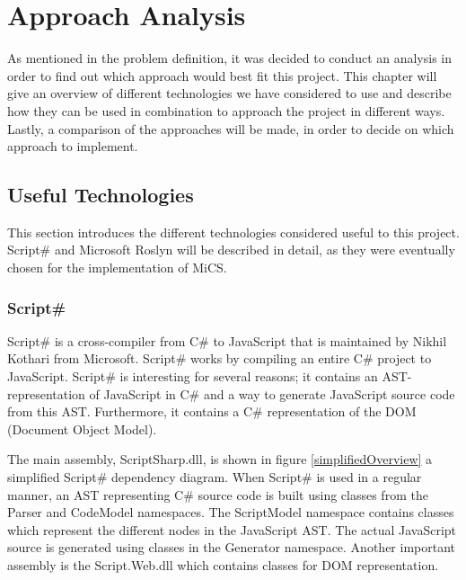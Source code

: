 \chapter{Approach Analysis}
	As mentioned in the problem definition, it was decided to conduct an analysis in order to find out which approach would best fit this project. This chapter will give an overview of different technologies we have considered to use and describe how they can be used in combination to approach the project in different ways. Lastly, a comparison of the approaches will be made, in order to decide on which approach to implement.

\section{Useful Technologies}
	This section introduces the different technologies considered useful to this project. Script\# and Microsoft Roslyn will be described in detail, as they were eventually chosen for the implementation of MiCS.

	

	\subsection{Script\#} %
	\label{sub:subsection_name}
		Script\# \cite{scriptsharp} is a cross-compiler from C\# to JavaScript that is maintained by Nikhil Kothari \cite{nikhilk} from Microsoft. Script\# works by compiling an entire C\# project to JavaScript. Script\# is interesting for several reasons; it contains an AST-representation of JavaScript in C\# and a way to generate JavaScript source code from this AST. Furthermore, it contains a C\# representation of the DOM (Document Object Model).

		The main assembly, ScriptSharp.dll, is shown in figure \ref{simplifiedOverview} a simplified Script\# dependency diagram. When Script\# is used in a regular manner, an AST representing C\# source code is built using classes from the Parser and CodeModel namespaces. The ScriptModel namespace contains classes which represent the different nodes in the JavaScript AST. The actual JavaScript source is generated using classes in the Generator namespace. Another important assembly is the Script.Web.dll which contains classes for DOM representation.

